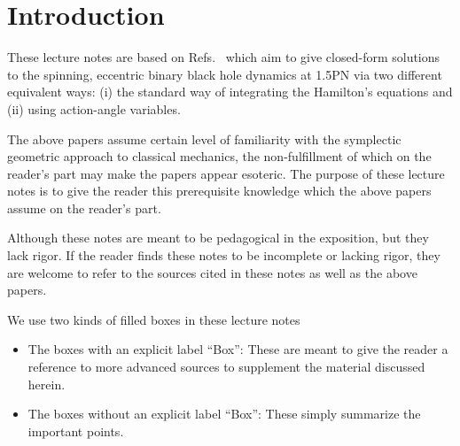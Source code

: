 \chapter{Introduction}



These lecture notes are based on Refs.~\cite{tanay2021action, tanay2021integrability, Cho:2019brd}
 which aim to give closed-form solutions to the spinning, eccentric
binary black hole dynamics at 1.5PN via two different equivalent ways: (i)
the standard way of integrating the Hamilton's equations and (ii) using action-angle variables.



The above papers assume certain level of familiarity
with the symplectic geometric approach to classical mechanics, the non-fulfillment
of which on the reader's part may make the papers appear esoteric.
The purpose of these lecture notes is to give the reader this prerequisite
 knowledge which the above papers assume on the reader's part. 

Although these notes are meant to be pedagogical 
in the exposition, but they
lack rigor. If the reader 
finds these notes to be incomplete or lacking rigor, they are welcome to
refer to the sources cited in these notes as well as the above papers.



We use two kinds of filled boxes in these lecture notes
\begin{itemize}
\item The boxes with an explicit label ``Box'': These are meant
to give the reader a reference to more advanced sources to supplement
the material discussed herein. 
\item The boxes without an explicit label ``Box'': These simply 
summarize the important points.
\end{itemize}